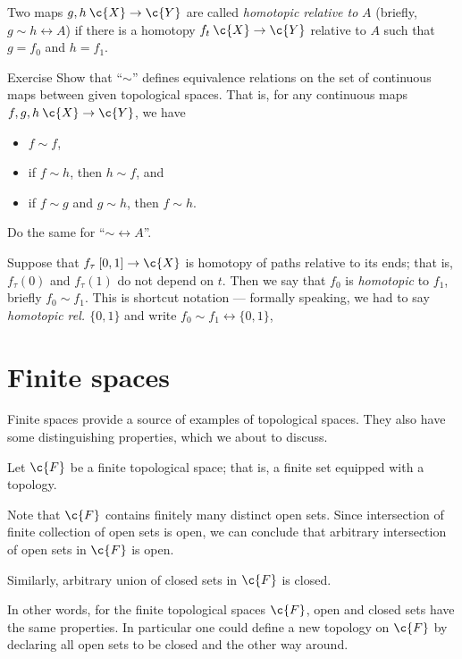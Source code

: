 Two maps $g,h\:\c{X}\to \c{Y}$ are called \emph{homotopic relative to} $A$ (briefly, $g\sim h\rel A$)
if there is a homotopy $f_t\:\c{X}\to \c{Y}$ relative to $A$ such that $g=f_0$ and $h=f_1$.

\begin{thm}{Exercise}\label{ex:hom-eq}
Show that ``$\sim$''  defines equivalence relations on the set of continuous maps between given topological spaces.
That is, for any continuous maps $f,g,h\:\c{X}\to \c{Y}$, we have
\begin{itemize}
\item $f\sim f$,
\item if $f\sim h$, then $h\sim f$, and
\item if $f\sim g$ and $g\sim h$, then $f\sim h$.
\end{itemize}
Do the same for ``$\sim\rel A$''.
\end{thm}

Suppose that $f_\tau\:[0,1]\to\c{X}$ is homotopy of paths relative to its ends;
that is, $f_\tau(0)$ and $f_\tau(1)$ do not depend on $t$.
Then we say that $f_0$ is \emph{homotopic} to $f_1$, briefly $f_0\sim f_1$.
This is shortcut notation --- formally speaking, we had to say \textit{homotopic rel. $\{0,1\}$} and write $f_0\sim f_1\rel{\{0,1\}}$,
















\section{Finite spaces}\label{sec:finite}

Finite spaces provide a source of examples of topological spaces.
They also have some distinguishing properties, which we about to discuss.

Let $\c{F}$ be a finite topological space;
that is, a finite set equipped with a topology.

Note that $\c{F}$ contains finitely many distinct open sets.
Since intersection of finite collection of open sets is open,
we can conclude that arbitrary intersection of open sets in $\c{F}$ is open.

Similarly, arbitrary union of closed sets in $\c{F}$ is closed.

In other words, for the finite topological spaces $\c{F}$, open and closed sets have the same properties.
In particular one could define a new topology on $\c{F}$ by declaring all open sets to be closed and the other way around.

